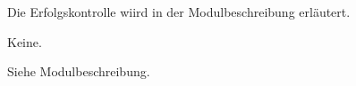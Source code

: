 \begin{course}

\setdoclanguagegerman
{}



\coursehead


\label{cour_15785.dp_997}


\begin{styleenv}
\begin{assessment}
Die Erfolgskontrolle wiird in der Modulbeschreibung erläutert.


\end{assessment}

\begin{conditions}Keine.\end{conditions}


\end{styleenv}

\begin{learningoutcomes}

\end{learningoutcomes}

\begin{content}
Siehe Modulbeschreibung.


\end{content}







\end{course}
